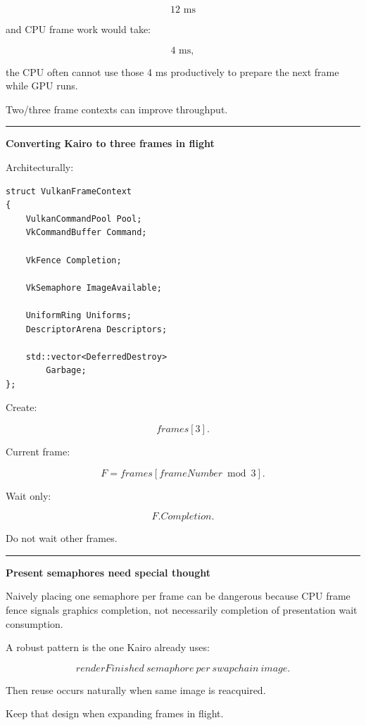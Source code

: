 \[
12\text{ ms}
\]

and CPU frame work would take:

\[
4\text{ ms},
\]

the CPU often cannot use those 4 ms productively to prepare the next frame while GPU runs.

Two/three frame contexts can improve throughput.

\begin{center}\rule{0.5\linewidth}{0.5pt}\end{center}

\textbf{Converting Kairo to three frames in flight}

Architecturally:

\begin{verbatim}
struct VulkanFrameContext
{
    VulkanCommandPool Pool;
    VkCommandBuffer Command;

    VkFence Completion;

    VkSemaphore ImageAvailable;

    UniformRing Uniforms;
    DescriptorArena Descriptors;

    std::vector<DeferredDestroy>
        Garbage;
};
\end{verbatim}

Create:

\[
frames[3].
\]

Current frame:

\[
F=
frames[
frameNumber\bmod3
].
\]

Wait only:

\[
F.Completion.
\]

Do not wait other frames.

\begin{center}\rule{0.5\linewidth}{0.5pt}\end{center}

\textbf{Present semaphores need special thought}

Naively placing one  semaphore per frame can be dangerous because CPU frame fence signals graphics completion, not necessarily completion of presentation wait consumption.

A robust pattern is the one Kairo already uses:

\[
\boxed{
renderFinished\ semaphore\ per\ swapchain\ image.
}
\]

Then reuse occurs naturally when same image is reacquired.

Keep that design when expanding frames in flight.

